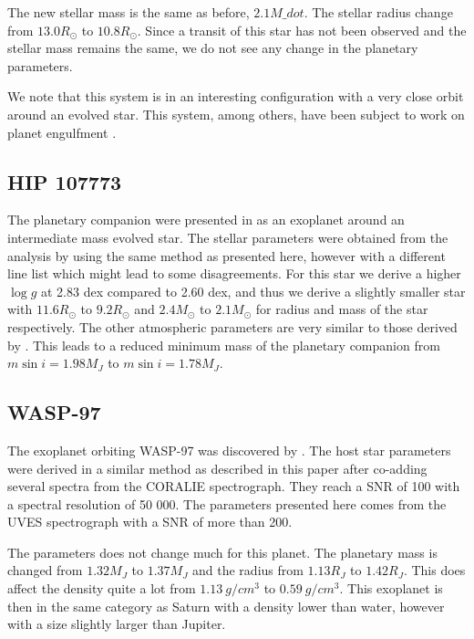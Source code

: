 \documentclass{aa}
\begin{document}
The new stellar mass is the same as before, $2.1M\_dot$. The stellar radius
change from $13.0R_\odot$ to $10.8R_\odot$. Since a transit of this star has not
been observed and the stellar mass remains the same, we do not see any change in
the planetary parameters.

We note that this system is in an interesting configuration with a very close
orbit around an evolved star. This system, among others, have been subject
to work on planet engulfment \citep[see e.g.][]{Kunitomo2011}.


\subsection{HIP 107773}
\label{sub:HIP_107773}
The planetary companion were presented in \citet{Jones2015} as an exoplanet
around an intermediate mass evolved star. The stellar parameters were obtained
from the analysis by \citet{Jones2011} using the same method as presented here,
however with a different line list which might lead to some disagreements. For
this star we derive a higher $\log g$ at 2.83 dex compared to 2.60 dex, and thus
we derive a slightly smaller star with $11.6R_\odot$ to $9.2R_\odot$ and
$2.4M_\odot$ to $2.1M_\odot$ for radius and mass of the star respectively. The
other atmospheric parameters are very similar to those derived by
\citet{Jones2011}. This leads to a reduced minimum mass of the planetary
companion from $m\sin i=1.98M_J$ to $m\sin i=1.78M_J$.



\subsection{WASP-97}
\label{sub:WASP-97}
The exoplanet orbiting WASP-97 was discovered by \citet{Hellier2014}. The host
star parameters were derived in a similar method as described in this paper
after co-adding several spectra from the CORALIE spectrograph. They reach a
SNR of 100 with a spectral resolution of 50 000. The parameters presented here
comes from the UVES spectrograph with a SNR of more than 200.

The parameters does not change much for this planet. The planetary mass is
changed from $1.32M_J$ to $1.37M_J$ and the radius from $1.13R_J$ to $1.42R_J$.
This does affect the density quite a lot from $\SI{1.13}{g/cm^3}$ to
$\SI{0.59}{g/cm^3}$. This exoplanet is then in the same category as Saturn with
a density lower than water, however with a size slightly larger than Jupiter.
\end{document}
